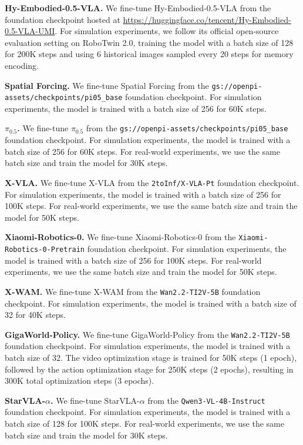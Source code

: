 \textbf{Hy-Embodied-0.5-VLA.}
We fine-tune Hy-Embodied-0.5-VLA from the foundation checkpoint hosted at \url{https://huggingface.co/tencent/Hy-Embodied-0.5-VLA-UMI}.
For simulation experiments, we follow its official open-source evaluation setting on RoboTwin 2.0, training the model with a batch size of 128 for 200K steps and using 6 historical images sampled every 20 steps for memory encoding.

\textbf{Spatial Forcing.}
We fine-tune Spatial Forcing from the \texttt{gs://openpi-assets/checkpoints/pi05\_base} foundation checkpoint.
For simulation experiments, the model is trained with a batch size of 256 for 60K steps.

\textbf{$\pi_{0.5}$.}
We fine-tune $\pi_{0.5}$ from the \texttt{gs://openpi-assets/checkpoints/pi05\_base} foundation checkpoint.
For simulation experiments, the model is trained with a batch size of 256 for 60K steps.
For real-world experiments, we use the same batch size and train the model for 30K steps.

\textbf{X-VLA.}
We fine-tune X-VLA from the \texttt{2toInf/X-VLA-Pt} foundation checkpoint.
For simulation experiments, the model is trained with a batch size of 256 for 100K steps.
For real-world experiments, we use the same batch size and train the model for 50K steps.

\textbf{Xiaomi-Robotics-0.}
We fine-tune Xiaomi-Robotics-0 from the \texttt{Xiaomi-Robotics-0-Pretrain} foundation checkpoint.
For simulation experiments, the model is trained with a batch size of 256 for 100K steps.
For real-world experiments, we use the same batch size and train the model for 50K steps.

\textbf{X-WAM.}
We fine-tune X-WAM from the \texttt{Wan2.2-TI2V-5B} foundation checkpoint.
For simulation experiments, the model is trained with a batch size of 32 for 40K steps.

\textbf{GigaWorld-Policy.}
We fine-tune GigaWorld-Policy from the \texttt{Wan2.2-TI2V-5B} foundation checkpoint.
For simulation experiments, the model is trained with a batch size of 32.
The video optimization stage is trained for 50K steps (1 epoch), followed by the action optimization stage for 250K steps (2 epochs), resulting in 300K total optimization steps (3 epochs).

\textbf{StarVLA-$\alpha$.}
We fine-tune StarVLA-$\alpha$ from the \texttt{Qwen3-VL-4B-Instruct} foundation checkpoint.
For simulation experiments, the model is trained with a batch size of 128 for 100K steps.
For real-world experiments, we use the same batch size and train the model for 30K steps.

